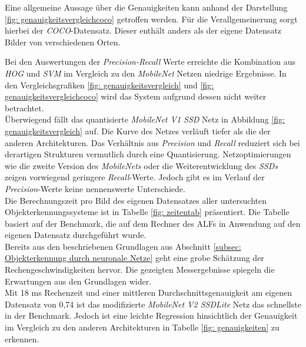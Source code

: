 

Eine allgemeine Aussage über die Genauigkeiten kann anhand der Darstellung \ref{fig: genauigkeitsvergleichcoco} getroffen werden. Für die Verallgemeinerung sorgt hierbei der \textit{COCO}-Datensatz. Dieser enthält anders als der eigene Datensatz Bilder von verschiedenen Orten.     






Bei den Auswertungen der \textit{Precision-Recall} Werte erreichte die Kombination aus \textit{HOG} und \textit{SVM} im Vergleich zu den \textit{MobileNet} Netzen niedrige Ergebnisse. In den Vergleichsgrafiken \ref{fig: genauigkeitsvergleich} und \ref{fig: genauigkeitsvergleichcoco} wird das System aufgrund dessen nicht weiter betrachtet.\\

Überwiegend fällt das quantisierte \textit{MobileNet V1 SSD} Netz in Abbildung \ref{fig: genauigkeitsvergleich} auf. Die Kurve des Netzes verläuft tiefer als die der anderen Architekturen. Das Verhältnis aus \textit{Precision} und \textit{Recall} reduziert sich bei derartigen Strukturen vermutlich durch eine Quantisierung. Netzoptimierungen wie die zweite Version des \textit{MobileNets} oder die Weiterentwicklung des \textit{SSDs} zeigen vorwiegend geringere \textit{Recall}-Werte. Jedoch gibt es im Verlauf der \textit{Precision}-Werte keine nennenswerte Unterschiede. \\

Die Berechnungszeit pro Bild des eigenen Datensatzes aller untersuchten Objekterkennungssysteme ist in Tabelle \ref{fig: zeitentab} präsentiert. Die Tabelle basiert auf der Benchmark, die auf dem Rechner des ALFs in Anwendung auf den eigenen Datensatz durchgeführt wurde.\\





Bereits aus den beschriebenen Grundlagen aus Abschnitt \ref{subsec: Objekterkennung durch neuronale Netze} geht eine grobe Schätzung der Rechengeschwindigkeiten hervor. Die gezeigten Messergebnisse spiegeln die Erwartungen aus den Grundlagen wider.\\





Mit 18 ms Rechenzeit und einer mittleren Durchschnittsgenauigkeit am eigenen Datensatz von 0,74 ist das modifizierte \textit{MobileNet V2 SSDLite} Netz das schnellste in der Benchmark. Jedoch ist eine leichte Regression hinsichtlich der Genauigkeit im Vergleich zu den anderen Architekturen in Tabelle \ref{fig: genauigkeiten} zu erkennen.  




